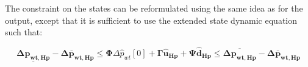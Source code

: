 %




The constraint on the states can be reformulated using the same idea as for the output, except that it is sufficient to use the extended state dynamic equation such that: 

\begin{equation}
	\underline{\bm{\Delta p_{wt,Hp}}} - \bm{\Delta \bar{p}_{wt,Hp}} \leq \bm{\Phi} \Delta \hat{p}_{wt}[0] +   \bm{\Gamma} \bm{\hat{u}_{Hp}} + \bm{\Psi}  \bm{\hat{d}_{Hp}} \leq \overline{\bm{\Delta p_{wt,Hp}}} - \bm{\Delta \bar{p}_{wt,Hp}} 
	\label{eq:stateconstraint}
\end{equation}

